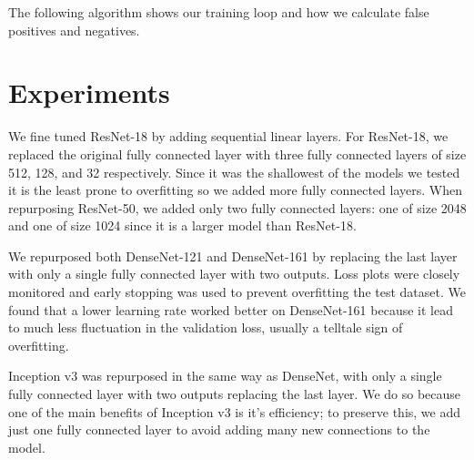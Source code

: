 \documentclass{article}
\begin{document}
\begin{algorithm}[H]
\caption{The following algorithm shows our training loop and how we calculate false positives and negatives.}
\SetAlgoLined
\end{algorithm}

    

\section{Experiments}
We fine tuned ResNet-18 by adding sequential linear layers. For ResNet-18, we replaced the original fully connected layer with three fully connected layers of size 512, 128, and 32 respectively. Since it was the shallowest of the models we tested it is the least prone to overfitting so we added more fully connected layers. When repurposing ResNet-50, we added only two fully connected layers: one of size 2048 and one of size 1024 since it is a larger model than ResNet-18.

We repurposed both DenseNet-121 and DenseNet-161 by replacing the last layer with only a single fully connected layer with two outputs. Loss plots were closely monitored and early stopping was used to prevent overfitting the test dataset. We found that a lower learning rate worked better on DenseNet-161 because it lead to much less fluctuation in the validation loss, usually a telltale sign of overfitting.

Inception v3 was repurposed in the same way as DenseNet, with only a single fully connected layer with two outputs replacing the last layer. We do so because one of the main benefits of Inception v3 is it's efficiency; to preserve this, we add just one fully connected layer to avoid adding many new connections to the model.
\end{document}
